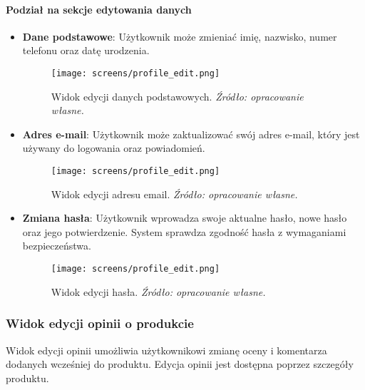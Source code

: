 \documentclass[12pt,a4paper,oneside]{article}
\theoremstyle{definition}
\numberwithin{equation}{section}
\begin{document}
\paragraph{Podział na sekcje edytowania danych}
\begin{itemize}
    \item \textbf{Dane podstawowe}: Użytkownik może zmieniać imię, nazwisko, numer telefonu oraz datę urodzenia.
    
\begin{figure}[H]
    \centering
    \texttt{[image: screens/profile\_edit.png]}
    \caption{Widok edycji danych podstawowych. \emph{Źródło: opracowanie własne.}}
    \label{fig:profile_edit_first}
\end{figure}

    \item \textbf{Adres e-mail}: Użytkownik może zaktualizować swój adres e-mail, który jest używany do logowania oraz powiadomień.
    
\begin{figure}[H]
    \centering
    \texttt{[image: screens/profile\_edit.png]}
    \caption{Widok edycji adresu email. \emph{Źródło: opracowanie własne.}}
    \label{fig:profile_edit_email}
\end{figure}
    
    \item \textbf{Zmiana hasła}: Użytkownik wprowadza swoje aktualne hasło, nowe hasło oraz jego potwierdzenie. System sprawdza zgodność hasła z wymaganiami bezpieczeństwa.

    \begin{figure}[H]
        \centering
        \texttt{[image: screens/profile\_edit.png]}
        \caption{Widok edycji hasła. \emph{Źródło: opracowanie własne.}}
        \label{fig:profile_password}
    \end{figure}
    
\end{itemize}





\subsubsection{Widok edycji opinii o produkcie}
Widok edycji opinii umożliwia użytkownikowi zmianę oceny i komentarza dodanych wcześniej do produktu. Edycja opinii jest dostępna poprzez szczegóły produktu.
\end{document}
